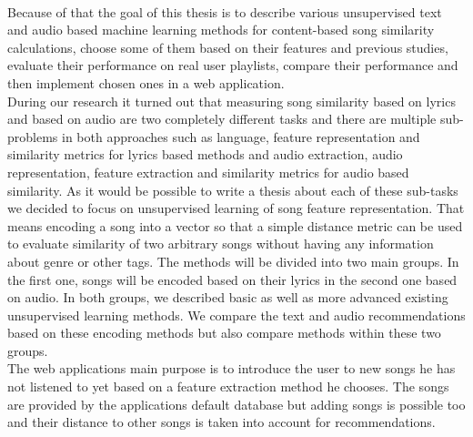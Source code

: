  \\
Because of that the goal of this thesis is to describe various unsupervised text and audio based machine learning methods for content-based song similarity calculations, choose some of them based on their features and previous studies, evaluate their performance on real user playlists, compare their performance and then implement chosen ones in a web application.\\
During our research it turned out that measuring song similarity based on lyrics and based on audio are two completely different tasks and there are multiple sub-problems in both approaches such as language, feature representation and similarity metrics for lyrics based methods and audio extraction, audio representation, feature extraction and similarity metrics for audio based similarity. As it would be possible to write a thesis about each of these sub-tasks we decided to focus on unsupervised learning of song feature representation. That means encoding a song into a vector so that a simple distance metric can be used to evaluate similarity of two arbitrary songs without having any information about genre or other tags. The methods will be divided into two main groups. In the first one, songs will be encoded based on their lyrics in the second one based on audio. In both groups, we described basic as well as more advanced existing unsupervised learning methods. We compare the text and audio recommendations based on these encoding methods but also compare methods within these two groups. \\
The web applications main purpose is to introduce the user to new songs he has not listened to yet based on a feature extraction method he chooses. The songs are provided by the applications default database but adding songs is possible too and their distance to other songs is taken into account for recommendations. \\



